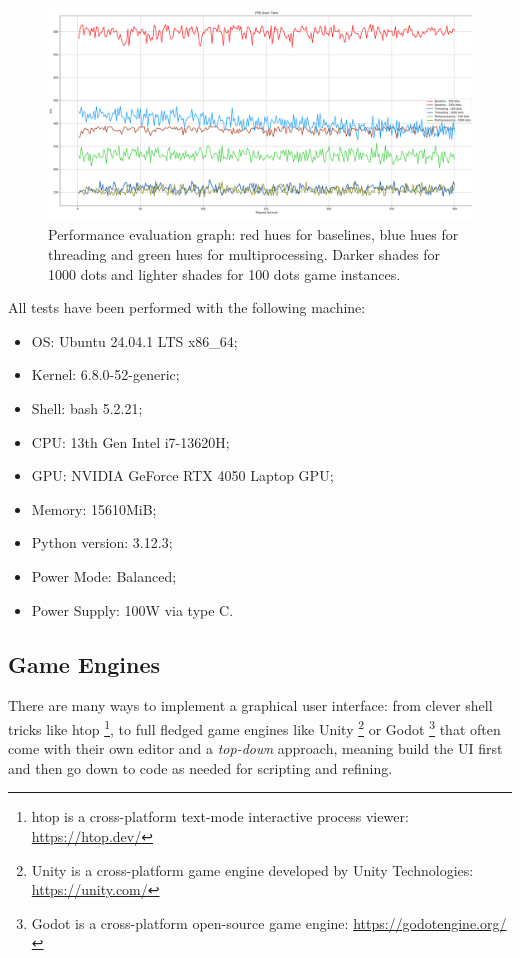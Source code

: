 \begin{figure}[h]
  \centering
  \includegraphics[width=\linewidth]{images/performance_eval_fps_graph.png}
  \caption{Performance evaluation graph: red hues for baselines, blue hues for threading and green hues for multiprocessing. Darker shades for 1000 dots and lighter shades for 100 dots game instances.}
  \label{fig:peval}
\end{figure}

All tests have been performed with the following machine: 

\begin{itemize}
    \item OS: Ubuntu 24.04.1 LTS x86\_64;
    \item Kernel: 6.8.0-52-generic;
    \item Shell: bash 5.2.21;
    \item CPU: 13th Gen Intel i7-13620H;
    \item GPU: NVIDIA GeForce RTX 4050 Laptop GPU;
    \item Memory: 15610MiB;
    \item Python version: 3.12.3;
    \item Power Mode: Balanced;
    \item Power Supply: 100W via type C.
\end{itemize}

\subsection{Game Engines} \label{sec:pygame}

There are many ways to implement a graphical user interface: from clever shell tricks like htop \footnote{htop is a cross-platform text-mode interactive process viewer: \url{https://htop.dev/}}, to full fledged game engines like Unity \footnote{Unity is a cross-platform game engine developed by Unity Technologies: \url{https://unity.com/}} or Godot \footnote{Godot is a cross-platform open-source game engine: \url{https://godotengine.org/}} that often come with their own editor and a \textit{top-down} approach, meaning build the UI first and then go down to code as needed for scripting and refining.

